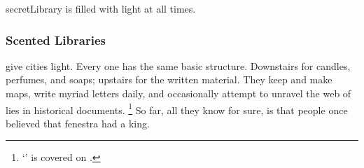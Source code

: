 \begin{multicols}{2}
\begin{description}
  \Gls{secretLibrary} is filled with light at all times.
  \fi
\end{description}

\subsubsection{Scented Libraries}
give cities light.
Every one has the same basic structure.
Downstairs for candles, perfumes, and soaps; upstairs for the written material.
They keep and make maps, write myriad letters daily, and occasionally attempt to unravel the web of lies in historical documents.%
\footnote{`' is covered on .}
So far, all they know for sure, is that people once believed that \gls{fenestra} had a king.

\end{multicols}

